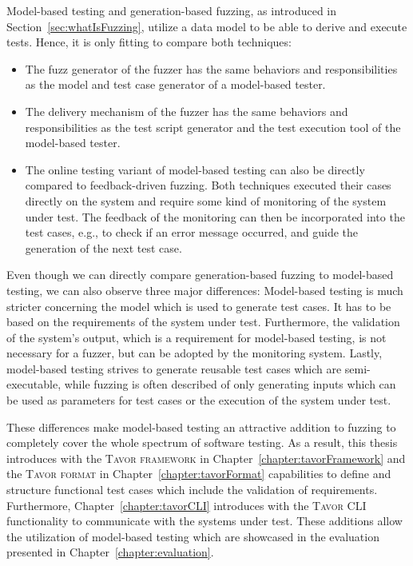 Model-based testing and generation-based fuzzing, as introduced in Section~\ref{sec:whatIsFuzzing}, utilize a data model to be able to derive and execute tests. Hence, it is only fitting to compare both techniques:
\begin{itemize}
\item The fuzz generator of the fuzzer has the same behaviors and responsibilities as the model and test case generator of a model-based tester.
\item The delivery mechanism of the fuzzer has the same behaviors and responsibilities as the test script generator and the test execution tool of the model-based tester.
\item The online testing variant of model-based testing can also be directly compared to feedback-driven fuzzing. Both techniques executed their cases directly on the system and require some kind of monitoring of the system under test. The feedback of the monitoring can then be incorporated into the test cases, e.g., to check if an error message occurred, and guide the generation of the next test case.
\end{itemize}
Even though we can directly compare generation-based fuzzing to model-based testing, we can also observe three major differences: Model-based testing is much stricter concerning the model which is used to generate test cases. It has to be based on the requirements of the system under test. Furthermore, the validation of the system's output, which is a requirement for model-based testing, is not necessary for a fuzzer, but can be adopted by the monitoring system. Lastly, model-based testing strives to generate reusable test cases which are semi-executable, while fuzzing is often described of only generating inputs which can be used as parameters for test cases or the execution of the system under test.

These differences make model-based testing an attractive addition to fuzzing to completely cover the whole spectrum of software testing. As a result, this thesis introduces with the \textsc{Tavor framework} in Chapter~\ref{chapter:tavorFramework} and the \textsc{Tavor format} in Chapter~\ref{chapter:tavorFormat} capabilities to define and structure functional test cases which include the validation of requirements. Furthermore, Chapter~\ref{chapter:tavorCLI} introduces with the \textsc{Tavor CLI} functionality to communicate with the systems under test. These additions allow the utilization of model-based testing which are showcased in the evaluation presented in Chapter~\ref{chapter:evaluation}.

